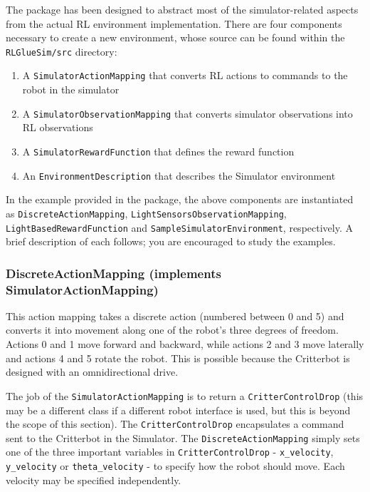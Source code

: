 \documentclass[12pt]{article}
\newcommand{\code}[1]{\texttt{#1}}
\begin{document}
The package has been designed to abstract most of the simulator-related
aspects from the actual RL environment implementation. There are four 
components necessary to create a new environment, whose source can be found 
within the \code{RLGlueSim/src} directory:

\begin{enumerate}
\item{A \code{SimulatorActionMapping} that converts RL actions to commands to the robot in the simulator}
\item{A \code{SimulatorObservationMapping} that converts simulator observations into RL observations}
\item{A \code{SimulatorRewardFunction} that defines the reward function}
\item{An \code{EnvironmentDescription} that describes the Simulator environment}
\end{enumerate}

In the example provided in the package, the above components are instantiated
as \code{DiscreteActionMapping}, \code{LightSensorsObservationMapping},
\code{LightBasedRewardFunction} and \code{SampleSimulatorEnvironment},
respectively. A brief description of each follows; you are encouraged to
study the examples.

\subsubsection[DiscreteActionMapping]{DiscreteActionMapping (implements SimulatorActionMapping)}

This action mapping takes a discrete action (numbered between 0 and 5) and
converts it into movement along one of the robot's three degrees of freedom.
Actions 0 and 1 move forward and backward, while actions 2 and 3 move
laterally and actions 4 and 5 rotate the robot. This is possible because the
Critterbot is designed with an omnidirectional drive.

The job of the \code{SimulatorActionMapping} is to return a 
\code{CritterControlDrop} (this may be a different class if a different
robot interface is used, but this is beyond the scope of this section).
The \code{CritterControlDrop} encapsulates a command sent to the Critterbot
in the Simulator. The \code{DiscreteActionMapping} simply sets one of the
three important variables in \code{CritterControlDrop} - \verb+x_velocity+,
\verb+y_velocity+ or \verb+theta_velocity+ - to specify how the robot
should move. Each velocity may be specified independently.
\end{document}
